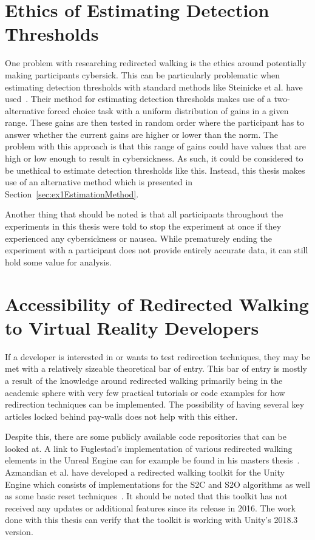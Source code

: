 \section{Ethics of Estimating Detection Thresholds}\label{sec:ethics}
One problem with researching redirected walking is the ethics around potentially making participants cybersick. This can be particularly problematic when estimating detection thresholds with standard methods like Steinicke et al. have used~\cite{5072212}. Their method for estimating detection thresholds makes use of a two-alternative forced choice task with a uniform distribution of gains in a given range. These gains are then tested in random order where the participant has to answer whether the current gains are higher or lower than the norm. The problem with this approach is that this range of gains could have values that are high or low enough to result in cybersickness. As such, it could be considered to be unethical to estimate detection thresholds like this. Instead, this thesis makes use of an alternative method which is presented in Section~\ref{sec:ex1EstimationMethod}.

Another thing that should be noted is that all participants throughout the experiments in this thesis were told to stop the experiment at once if they experienced any cybersickness or nausea. While prematurely ending the experiment with a participant does not provide entirely accurate data, it can still hold some value for analysis. 
   
\section{Accessibility of Redirected Walking to Virtual Reality Developers}
If a developer is interested in or wants to test redirection techniques, they may be met with a relatively sizeable theoretical bar of entry. This bar of entry is mostly a result of the knowledge around redirected walking primarily being in the academic sphere with very few practical tutorials or code examples for how redirection techniques can be implemented. The possibility of having several key articles locked behind pay-walls does not help with this either. 

Despite this, there are some publicly available code repositories that can be looked at. A link to Fuglestad's implementation of various redirected walking elements in the Unreal Engine can for example be found in his masters thesis~\cite{fuglestad2018redirected}. Azmandian et al. have developed a redirected walking toolkit for the Unity Engine which consists of implementations for the S2C and S2O algorithms as well as some basic reset techniques~\cite{azmandian2016redirected}. It should be noted that this toolkit has not received any updates or additional features since its release in 2016. The work done with this thesis can verify that the toolkit is working with Unity's 2018.3 version.

